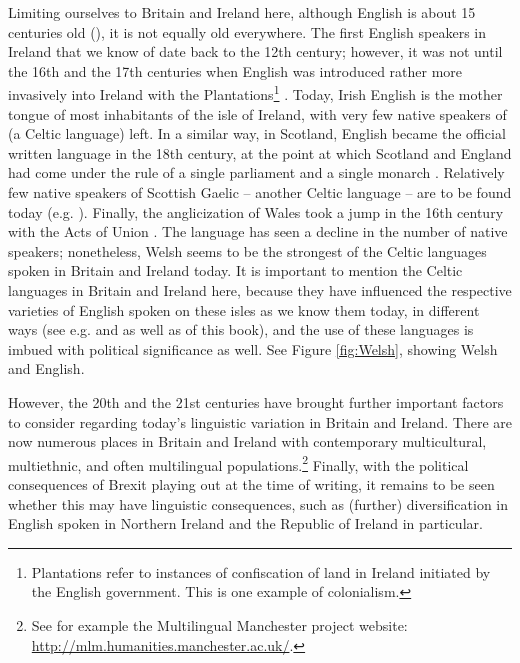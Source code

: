 Limiting ourselves to Britain and Ireland here, although English is about 15 centuries old (), it is not equally old everywhere. The first English speakers in Ireland that we know of date back to the 12th century; however, it was not until the 16th and the 17th centuries when English was introduced rather more invasively into Ireland with the Plantations\footnote{Plantations refer to instances of confiscation of land in Ireland initiated by the English government. This is one example of colonialism.} \citep{Hickey1993}. Today, Irish English is the mother tongue of most inhabitants of the isle of Ireland, with very few native speakers of  (a Celtic language) left. In a similar way, in Scotland, English became the official written language in the 18th century, at the point at which Scotland and England had come under the rule of a single parliament and a single monarch \citep[394]{Wells1982b}. Relatively few native speakers of Scottish Gaelic -- another Celtic language -- are to be found today (e.g. \citealp{Nance2013}). Finally, the anglicization of Wales took a jump in the 16th century with the Acts of Union \citep{Williams1990}. The  language has seen a decline in the number of native speakers; nonetheless, Welsh seems to be the strongest of the Celtic languages spoken in Britain and Ireland today. It is important to mention the Celtic languages in Britain and Ireland here, because they have influenced the respective varieties of English spoken on these isles as we know them today, in different ways (see e.g. \citealp{FilppulaKlemolaPaulasto2008} and \citealp{Hickey2012} as well as  of this book), and the use of these languages is imbued with political significance as well. See Figure \ref{fig:Welsh}, showing Welsh and English.

However, the 20th and the 21st centuries have brought further important factors to consider regarding today's linguistic variation in Britain and Ireland. There are now numerous places in Britain and Ireland with contemporary multicultural, multiethnic, and often multilingual populations.\footnote{See for example the Multilingual Manchester project website: \url{http://mlm.humanities.manchester.ac.uk/}.} Finally, with the political consequences of Brexit playing out at the time of writing, it remains to be seen whether this may have linguistic consequences, such as (further) diversification in English spoken in Northern Ireland and the Republic of Ireland in particular.

